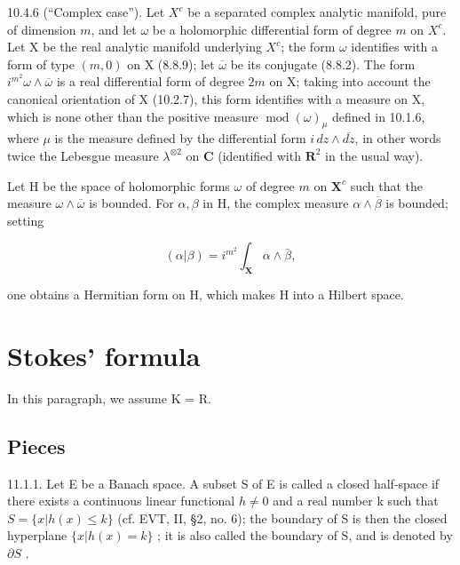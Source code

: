 10.4.6 (“Complex case”). Let \(X^{c}\) be a separated complex analytic manifold, pure of dimension \(m\), and let \(\omega\) be a holomorphic differential form of degree \(m\) on \(X^{c}\). Let X be the real analytic manifold underlying \(X^{c}\); the form \(\omega\) identifies with a form of type \((m,0)\) on X (8.8.9); let \(\overline{\omega}\) be its conjugate (8.8.2). The form \(i^{m^{2}}\omega \wedge \overline{\omega}\) is a real differential form of degree \(2m\) on X; taking into account the canonical orientation of X (10.2.7), this form identifies with a measure on X, which is none other than the positive measure \(\operatorname{mod}(\omega)_{\mu}\) defined in 10.1.6, where \(\mu\) is the measure defined by the differential form \(i \, dz \wedge \overline{dz}\), in other words twice the Lebesgue measure \(\lambda^{\otimes 2}\) on \(\mathbf{C}\) (identified with \(\mathbf{R}^{2}\) in the usual way).

Let H be the space of holomorphic forms \(\omega\) of degree \(m\) on \(\mathbf{X}^c\) such that the measure \(\omega \wedge \overline{\omega}\) is bounded. For \(\alpha, \beta\) in H, the complex measure \(\alpha \wedge \overline{\beta}\) is bounded; setting

\[
(\alpha | \beta) = i ^ {m ^ {2}} \int_ {\mathbf {X}} \alpha \wedge \bar {\beta},
\]

one obtains a Hermitian form on H, which makes H into a Hilbert space.

\section{Stokes' formula}

In this paragraph, we assume K = R.

\subsection{Pieces}

11.1.1. Let E be a Banach space. A subset S of E is called a closed half-space if there exists a continuous linear functional \(h \neq 0\) and a real number k such that \(S = \{x|h(x) \leqslant k\}\) (cf. EVT, II, §2, no. 6); the boundary of S is then the closed hyperplane \(\{x|h(x) = k\}\) ; it is also called the boundary of S, and is denoted by \(\partial S\) .


